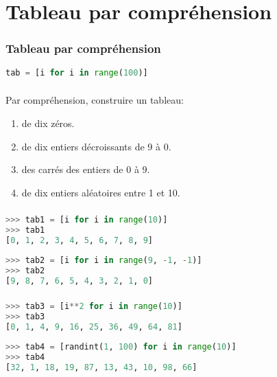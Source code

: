 \documentclass[svgnames,11pt]{beamer}
\begin{document}
\section{Tableau par compréhension}
\begin{frame}[fragile]
    \frametitle{Tableau par compréhension}

\begin{center}
\begin{lstlisting}[language=Python , basicstyle=\ttfamily\small, xleftmargin=2em, xrightmargin=2em]
tab = [i for i in range(100)]
\end{lstlisting}
\label{CODE}
\end{center}

\end{frame}
\begin{frame}
    \frametitle{}

    \begin{activite}
        Par compréhension, construire un tableau:
    \begin{enumerate}
        \item de dix zéros.
        \item de dix entiers décroissants de 9 à 0.
        \item des carrés des entiers de 0 à 9.
        \item de dix entiers aléatoires entre 1 et 10.
    \end{enumerate}
    \end{activite}

\end{frame}
\begin{frame}[fragile]
    \frametitle{}

    
\begin{lstlisting}[language=Python , basicstyle=\ttfamily\small, xleftmargin=2em, xrightmargin=2em]
>>> tab1 = [i for i in range(10)]
>>> tab1
[0, 1, 2, 3, 4, 5, 6, 7, 8, 9]
\end{lstlisting}

\begin{lstlisting}[language=Python , basicstyle=\ttfamily\small, xleftmargin=2em, xrightmargin=2em]
>>> tab2 = [i for i in range(9, -1, -1)]
>>> tab2
[9, 8, 7, 6, 5, 4, 3, 2, 1, 0]
\end{lstlisting}
\end{frame}
\begin{frame}[fragile]
    \frametitle{}

    
\begin{lstlisting}[language=Python , basicstyle=\ttfamily\small, xleftmargin=2em, xrightmargin=0em]
>>> tab3 = [i**2 for i in range(10)]
>>> tab3
[0, 1, 4, 9, 16, 25, 36, 49, 64, 81]
\end{lstlisting}

\begin{lstlisting}[language=Python , basicstyle=\ttfamily\small, xleftmargin=2em, xrightmargin=0em]
>>> tab4 = [randint(1, 100) for i in range(10)]
>>> tab4
[32, 1, 18, 19, 87, 13, 43, 10, 98, 66]
\end{lstlisting}
\end{frame}
\end{document}
